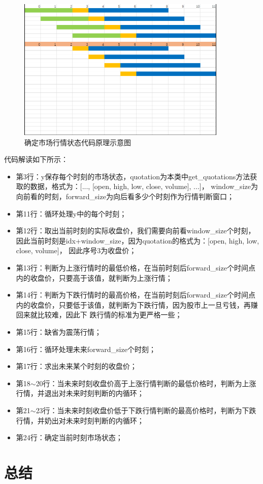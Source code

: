 \begin{figure}[H]
    \caption{确定市场行情状态代码原理示意图}
    \label{f000005}
    \centering
    \includegraphics[width=10cm]{images/f000005}
\end{figure}
代码解读如下所示：
\begin{itemize}
    \item 第3行：y保存每个时刻的市场状态，quotation为本类中get\_quotations方法获取的数据，格式为：[..., [open, high, low, close, volume], ...]，
    window\_size为向前看的时刻，forward\_size为向后看多少个时刻作为行情判断窗口；
    \item 第11行：循环处理y中的每个时刻；
    \item 第12行：取出当前时刻的实际收盘价，我们需要向前看window\_size个时刻，因此当前时刻是idx+window\_size，因为quotation的格式为：[open, high, low, close, volume]，
    因此序号3为收盘价；
    \item 第13行：判断为上涨行情时的最低价格，在当前时刻后forward\_size个时间点内的收盘价，只要高于该值，就判断为上涨行情；
    \item 第14行：判断为下跌行情时的最高价格，在当前时刻后forward\_size个时间点内的收盘价，只要低于该值，就判断为下跌行情，因为股市上一旦亏钱，再赚回来就比较难，因此下
    跌行情的标准为更严格一些；
    \item 第15行：缺省为震荡行情；
    \item 第16行：循环处理未来forward\_size个时刻；
    \item 第17行：求出未来某个时刻的收盘价；
    \item 第18$\sim$20行：当未来时刻收盘价高于上涨行情判断的最低价格时，判断为上涨行情，并退出对未来时刻判断的内循环；
    \item 第21$\sim$23行：当未来时刻收盘价低于下跌行情判断的最高价格时，判断为下跌行情，并奶出对未来时刻判断的内循环；
    \item 第24行：确定当前时刻市场状态；
\end{itemize}

\section{总结}